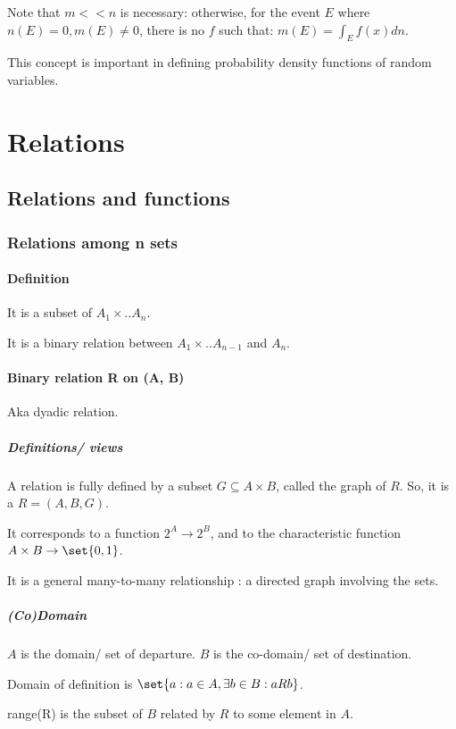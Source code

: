 \documentclass[oneside, article]{memoir}
\begin{document}
Note that $m<<n$ is necessary: otherwise, for the event $E$ where $n(E) = 0, m(E) \neq 0$, there is no $f$ such that: $m(E) = \int_{E} f(x) dn$.

This concept is important in defining probability density functions of random variables.

\part{Relations}
\chapter{Relations and functions}
\section{Relations among n sets}
\subsection{Definition}
It is a subset of $A_1 \times .. A_n$.

It is a binary relation between $A_1 \times .. A_{n-1}$ and $A_n$.

\subsection{Binary relation R on (A, B)}
Aka dyadic relation.

\subsubsection{Definitions/ views}
A relation is fully defined by a subset $G \subseteq A \times B$, called the graph of $R$. So, it is a $R = (A, B , G)$.

It corresponds to a function $2^{A} \to 2^{B}$, and to the characteristic function $A \times B \to \set{0, 1}$.

It is a general many-to-many relationship : a directed graph involving the sets.

\subsubsection{(Co)Domain}
$A$ is the domain/ set of departure. $B$ is the co-domain/ set of destination.

Domain of definition is $\set{a: a \in A, \exists b \in B: aRb}$.

range(R) is the subset of $B$ related by $R$ to some element in $A$.
\end{document}
